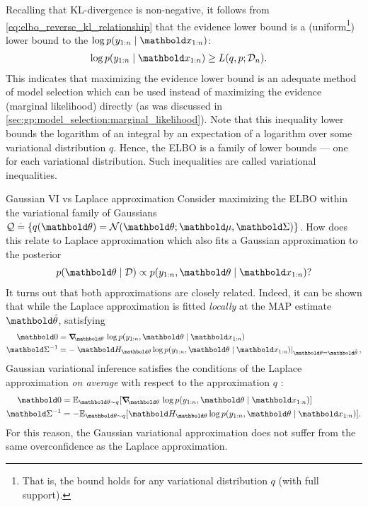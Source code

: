 Recalling that KL-divergence is non-negative, it follows from \cref{eq:elbo_reverse_kl_relationship} that the evidence lower bound is a (uniform\footnote{That is, the bound holds for any variational distribution $q$ (with full support).}) lower bound to the  $\log p(y_{1:n} \mid \vx_{1:n})$: \begin{align}
  \log p(y_{1:n} \mid \vx_{1:n}) &\geq L(q, p; \spD_n). \label{eq:log_evidence_bound}
\end{align}
This indicates that maximizing the evidence lower bound is an adequate method of model selection which can be used instead of maximizing the evidence (marginal likelihood) directly (as was discussed in \cref{sec:gp:model_selection:marginal_likelihood}).
Note that this inequality lower bounds the logarithm of an integral by an expectation of a logarithm over some variational distribution $q$.
Hence, the ELBO is a family of lower bounds --- one for each variational distribution.
Such inequalities are called variational inequalities.

\begin{ex}{Gaussian VI vs Laplace approximation}{}
  Consider maximizing the ELBO within the variational family of Gaussians $\spQ \defeq \braces*{q(\vtheta) = \N[\vtheta]{\vmu}{\mSigma}}$.
  How does this relate to Laplace approximation which also fits a Gaussian approximation to the posterior \begin{align*}
    p(\vtheta \mid \spD) \propto p(y_{1:n}, \vtheta \mid \vx_{1:n})?
  \end{align*}
  It turns out that both approximations are closely related.
  Indeed, it can be shown that while the Laplace approximation is fitted \emph{locally} at the MAP estimate $\vthetahat$, satisfying \begin{align}\begin{split}
    \vzero &= \grad_{\vtheta} \log p(y_{1:n}, \vtheta \mid \vx_{1:n}) \\
    \inv{\mSigma} &= - \left. \hes_{\vtheta} \log p(y_{1:n}, \vtheta \mid \vx_{1:n}) \right\rvert_{\vtheta = \vthetahat},
  \end{split}\label{eq:posterior_laplace_approx}\end{align} Gaussian variational inference satisfies the conditions of the Laplace approximation \emph{on average} with respect to the approximation $q$ : \begin{align}\begin{split}
    \vzero &= \E[\vtheta \sim q]{\grad_{\vtheta} \log p(y_{1:n}, \vtheta \mid \vx_{1:n})} \\
    \inv{\mSigma} &= - \E[\vtheta \sim q]{\hes_{\vtheta} \log p(y_{1:n}, \vtheta \mid \vx_{1:n})}.
  \end{split}\label{eq:gaussian_vi_conditions}\end{align}
  For this reason, the Gaussian variational approximation does not suffer from the same overconfidence as the Laplace approximation.
\end{ex}

